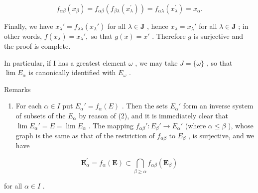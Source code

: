 \[
f _ {\alpha \beta} (x _ {\beta}) = f _ {\alpha \beta} (f _ {\beta \lambda} (x _ {\lambda} ^ {\prime})) = f _ {\alpha \lambda} (x _ {\lambda} ^ {\prime}) = x _ {\alpha}.
\]

Finally, we have \(x_{\lambda}' = f_{\lambda \lambda}(x_{\lambda}')\) for all \(\lambda \in \mathbf{J}\) , hence \(x_{\lambda} = x_{\lambda}'\) for all \(\lambda \in \mathbf{J}\) ; in other words, \(f(x_{\lambda}) = x_{\lambda}',\) so that \(g(x) = x'\) . Therefore \(g\) is surjective and the proof is complete.

In particular, if I has a greatest element \(\omega\) , we may take \(J = \{\omega\}\) , so that \(\lim E_{\alpha}\) is canonically identified with \(E_{\omega}\) .

Remarks

\begin{enumerate}
\def\labelenumi{(\arabic{enumi})}
\tightlist
\item
  For each \(\alpha \in I\) put \(E_{\alpha}' = f_{\alpha}(E)\) . Then the sets \(E_{\alpha}'\) form an inverse system of subsets of the \(E_{\alpha}\) by reason of (2), and it is immediately clear that \(\lim E_{\alpha}' = E = \lim E_{\alpha}\) . The mapping \(f_{\alpha\beta}' : E_{\beta}' \to E_{\alpha}'\) (where \(\alpha \leqslant \beta\) ), whose graph is the same as that of the restriction of \(f_{\alpha\beta}\) to \(E_{\beta}\) , is surjective, and we have
\end{enumerate}

\[
\mathbf {E} _ {\alpha} ^ {\prime} = f _ {\alpha} (\mathbf {E}) \subset \bigcap_ {\beta \geqslant \alpha} f _ {\alpha \beta} (\mathbf {E} _ {\beta})\tag{10}
\]

for all \(\alpha \in I\) .

